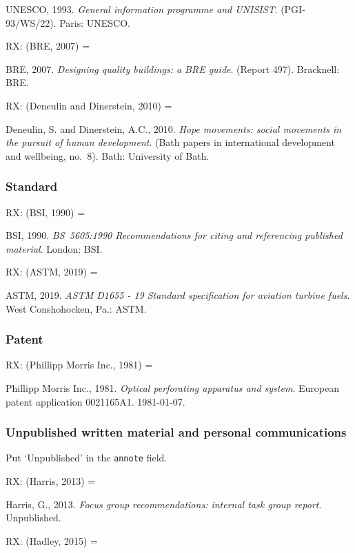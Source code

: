 UNESCO, 1993. \emph{General information programme and UNISIST}. (PGI-93/WS/22). Paris: UNESCO.


RX: (BRE, 2007) = \cite{bre2007dqb}

BRE, 2007. \emph{Designing quality buildings: a BRE guide}. (Report 497). Bracknell: BRE.


RX: (Deneulin and Dinerstein, 2010) = \cite{deneulin.dinerstein2010hms}

Deneulin, S. and Dinerstein, A.C., 2010. \emph{Hope movements: social movements in the pursuit of human development}. (Bath papers in international development and wellbeing, no.~8). Bath: University of Bath.



\subsubsection*{Standard}

RX: (BSI, 1990) = \cite{bs5605:1990}

BSI, 1990. \emph{BS~5605:1990 Recommendations for citing and referencing published material}. London: BSI.


RX: (ASTM, 2019) = \cite{astm.d1655}

ASTM, 2019. \emph{ASTM D1655 - 19 Standard specification for aviation turbine fuels}. West Conshohocken, Pa.: ASTM.



\subsubsection*{Patent}

RX: (Phillipp Morris Inc., 1981) = \cite{pm1981opa}

Phillipp Morris Inc., 1981. \emph{Optical perforating apparatus and system}. European patent application 0021165A1. 1981-01-07.



\subsubsection*{Unpublished written material and personal communications}

Put `Unpublished' in the \texttt{annote} field.

RX: (Harris, 2013) = \cite{harris2013fgr}

Harris, G., 2013. \emph{Focus group recommendations: internal task group report}. Unpublished.


RX: (Hadley, 2015) = \cite{hadley2015bir}

